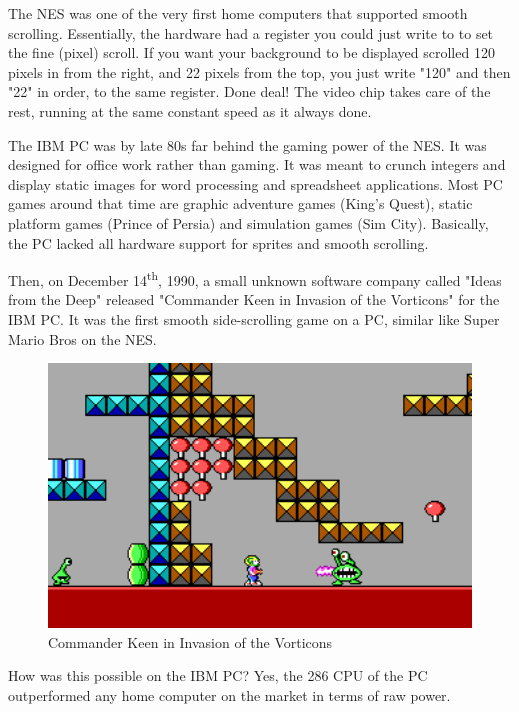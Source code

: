 \documentclass[book.tex]{subfiles}
\begin{document}
\par
The NES was one of the very first home computers that supported smooth scrolling. Essentially, the hardware had a register you could just write to to set the fine (pixel) scroll. If you want your background to be displayed scrolled 120 pixels in from the right, and 22 pixels from the top, you just write "120" and then "22" in order, to the same register. Done deal! The video chip takes care of the rest, running at the same constant speed as it always done.\\
\par
The IBM PC was by late 80s far behind the gaming power of the NES. It was designed for office work rather than gaming. It was meant to crunch integers and display static images for word processing and spreadsheet applications. Most PC games around that time are graphic adventure games (King's Quest), static platform games (Prince of Persia) and simulation games (Sim City). Basically, the PC lacked all hardware support for sprites and smooth scrolling.\\
\par
Then, on December 14\textsuperscript{th}, 1990, a small unknown software company called "Ideas from the Deep" released "Commander Keen in Invasion of the Vorticons" for the IBM PC. It was the first smooth side-scrolling game on a PC, similar like Super Mario Bros on the NES. \\
\begin{figure}[H]
  \centering
 \includegraphics[width=1.0\textwidth]{screenshots_300dpi/Keen_Marooned_on_Mars_gameplay.png}
\caption{Commander Keen in Invasion of the Vorticons}
\end{figure}
\par
How was this possible on the IBM PC? Yes, the 286 CPU of the PC outperformed any home computer on the market in terms of raw power.\\
\par

\end{document}
